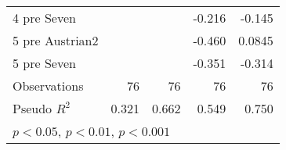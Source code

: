 \begin{table}[htbp]
\begin{tabular}{l*{4}{D{.}{.}{-1}}}
4 pre Seven         &                     &                     &      -0.216         &      -0.145\sym{*}  \\
5 pre Austrian2     &                     &                     &      -0.460\sym{**} &      0.0845         \\
5 pre Seven         &                     &                     &      -0.351\sym{**} &      -0.314\sym{***}\\
\midrule
Observations        &          76         &          76         &          76         &          76         \\
Pseudo \(R^{2}\)    &       0.321         &       0.662         &       0.549         &       0.750         \\
\bottomrule
{}\\
\end{tabular}
\end{table}
